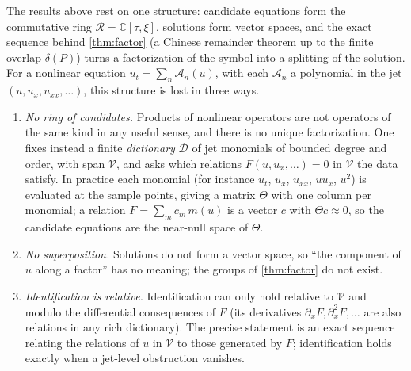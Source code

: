 \documentclass[11pt]{article}
\theoremstyle{plain}
\theoremstyle{definition}
\theoremstyle{remark}
\newcommand{\C}{\mathbb{C}}
\newcommand{\ring}{\mathcal{R}}            %
\newcommand{\deltaP}{\delta(P)}             %
\begin{document}
The results above rest on one structure: candidate equations form the commutative ring
$\ring=\C[\tau,\xi]$, solutions form vector spaces, and the exact sequence behind \cref{thm:factor} (a Chinese
remainder theorem up to the finite overlap $\deltaP$) turns a
factorization of the symbol into a splitting of the solution. For a nonlinear equation
$u_t=\sum_n\mathcal A_n(u)$, with each $\mathcal A_n$ a polynomial in the jet $(u,u_x,u_{xx},\dots)$, this structure is lost
in three ways.
\begin{enumerate}[label=(\roman*)]
  \item \emph{No ring of candidates.} Products of nonlinear operators are not operators of the same kind
  in any useful sense, and there is no unique factorization. One fixes instead a finite
  \emph{dictionary} $\mathcal D$ of jet monomials of bounded degree and order, with span $\mathcal V$, and asks
  which relations $F(u,u_x,\dots)=0$ in $\mathcal V$ the data satisfy. In practice each monomial (for instance
  $u_t$, $u_x$, $u_{xx}$, $uu_x$, $u^2$) is evaluated at the sample points, giving a matrix $\Theta$ with one column per
  monomial; a relation $F=\sum_mc_m\,m(u)$ is a vector $c$ with $\Theta c\approx0$, so the candidate equations are the
  near-null space of $\Theta$.
  \item \emph{No superposition.} Solutions do not form a vector space, so ``the component of $u$ along a
  factor'' has no meaning; the groups of \cref{thm:factor} do not exist.
  \item \emph{Identification is relative.} Identification can only hold relative to $\mathcal V$ and modulo the
  differential consequences of $F$ (its derivatives $\partial_xF,\partial_x^2F,\dots$ are also relations in
  any rich dictionary). The precise statement is an exact sequence relating the relations of $u$ in $\mathcal V$
  to those generated by $F$; identification holds exactly when a jet-level obstruction vanishes.
\end{enumerate}
\end{document}
